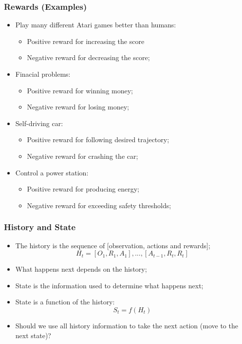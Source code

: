 \begin{frame}
    \frametitle{Rewards (Examples)}

    \begin{itemize}
        \item Play many different Atari games better than humans:
        \begin{itemize}
            \item Positive reward for increasing the score
            \item Negative reward for decreasing the score;
        \end{itemize}

        \item Finacial problems:
        \begin{itemize}
            \item Positive reward for winning money;
            \item Negative reward for losing money;
        \end{itemize}

        \item Self-driving car:
        \begin{itemize}
            \item Positive reward for following desired trajectory;
            \item Negative reward for crashing the car;
        \end{itemize}
        
        \item Control a power station:
        \begin{itemize}
            \item Positive reward for producing energy;
            \item Negative reward for exceeding safety thresholds;
        \end{itemize}
    \end{itemize}

\end{frame}

\begin{frame}
    \frametitle{History and State}

    \begin{itemize}
        \item The history is the sequence of [observation, actions and rewards];
            $$H_t = [O_1,R_1,A_1], ..., [A_{t-1},R_t,R_t]$$
        \item What happens next depends on the history;
        \item State is the information used to determine what happens next;

        \item State is a function of the history:
            $$S_t = f(H_t)$$

        \item Should we use all history information to take the next action (move to the next state)?
    \end{itemize}

\end{frame}


